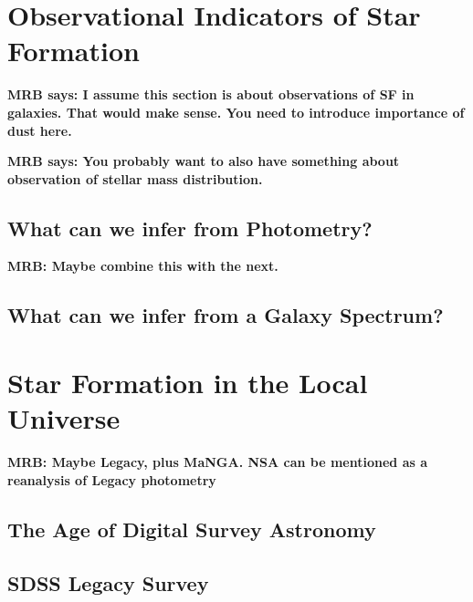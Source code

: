 \section{Observational Indicators of Star Formation}

{\bf MRB says: I assume this section is about observations 
of SF in galaxies. That would make sense. You need to 
introduce importance of dust here.}

{\bf MRB says: You probably want to also have something
about observation of stellar mass distribution.}

\subsection{What can we infer from Photometry?}

{\bf MRB: Maybe combine this with the next.}

\subsection{What can we infer from a Galaxy Spectrum?}

\section{Star Formation in the Local Universe}

{\bf MRB: Maybe Legacy, plus MaNGA. NSA can be mentioned
as a reanalysis of Legacy photometry}

\subsection{The Age of Digital Survey Astronomy}

\subsection{SDSS Legacy Survey}



